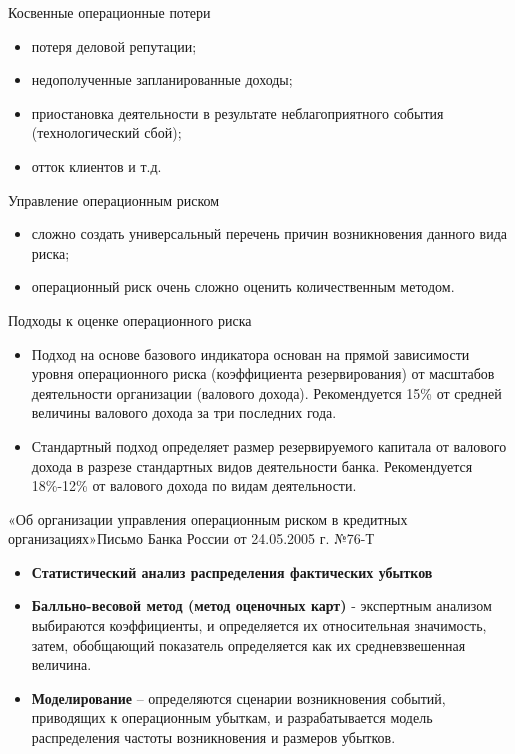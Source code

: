 \documentclass[financial_risks_lectures.tex]{subfiles}
\begin{document}
\begin{frame}{Косвенные операционные потери}
\begin{itemize}[<+->]
\item
потеря деловой репутации;
\item
недополученные запланированные доходы;
\item
приостановка деятельности в результате неблагоприятного события (технологический сбой);
\item
отток клиентов и т.д.
\end{itemize}
\end{frame}

\begin{frame}{Управление операционным риском}
\begin{itemize}[<+->]
\item
сложно создать универсальный перечень причин возникновения данного вида риска;
\item
операционный риск очень сложно оценить количественным методом.
\end{itemize}
\end{frame}

\begin{frame}{Подходы к оценке операционного риска}
\begin{itemize}[<+->]
\item
Подход на основе базового индикатора основан на прямой зависимости уровня операционного риска (коэффициента резервирования) от масштабов деятельности организации (валового дохода). Рекомендуется 15\% от средней величины валового дохода за три последних года.
\item
Стандартный подход определяет размер резервируемого капитала от валового дохода в разрезе стандартных видов деятельности банка. Рекомендуется 18\%-12\% от валового дохода по видам деятельности.
\end{itemize}
\end{frame}

\begin{frame}{«Об организации управления операционным риском в кредитных организациях»}{Письмо Банка России от 24.05.2005 г. №76-Т} 
\begin{itemize}[<+->]
\item
\textbf{Статистический анализ распределения фактических убытков}
\item
\textbf{Балльно-весовой метод (метод оценочных карт)} - экспертным анализом выбираются коэффициенты, и определяется их относительная значимость, затем, обобщающий показатель определяется как их средневзвешенная величина.
\item
\textbf{Моделирование }– определяются сценарии возникновения событий, приводящих к операционным убыткам, и разрабатывается модель распределения частоты возникновения и размеров убытков.
\end{itemize}
\end{frame}
\end{document}
